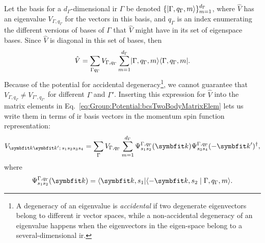 Let the basis for a $d_\Gamma$-dimensional \ac{ir} $\Gamma$ be denoted $\{\lvert \Gamma,q_\Gamma,m \rangle\}_{m=1}^{d_\Gamma}$, where $\hat{V}$ has an eigenvalue $V_{\Gamma,q_\Gamma}$
for the vectors in this basis, and $q_\Gamma$ is an index enumerating the different versions of bases of $\Gamma$ that $\hat{V}$ might have
in its set of eigenspace bases. Since $\hat{V}$ is diagonal in this set of bases, then
\begin{equation}
    \label{eq:Group:Potential:potIrrepDecomp}
    \hat{V} = \sum_{\Gamma q_\Gamma}V_{\Gamma,q_\Gamma}\sum_{m=1}^{d_\Gamma}\lvert \Gamma,q_\Gamma,m \rangle\langle \Gamma,q_\Gamma,m \rvert.
\end{equation}
Because of the potential for accidental degeneracy\footnote{A degeneracy of an eigenvalue is \emph{accidental} if two degenerate eigenvectors belong to different \ac{ir} vector spaces,
while a non-accidental degeneracy of an eigenvalue happens when the eigenvectors in the eigen-space belong to a several-dimensional \ac{ir}.},
we cannot guarantee that $V_{\Gamma,q_\Gamma}\neq V_{\Gamma',q_{\Gamma'}}$ for different $\Gamma$ and $\Gamma'$.
Inserting this expression for $\hat{V}$ into the matrix elements in Eq.~\eqref{eq:Group:Potential:bcsTwoBodyMatrixElem} lets us write them in terms of
\ac{ir} basis vectors in the momentum spin function representation:
\begin{equation}
    \label{eq:Group:Potential:irrepPotMatrixElem}
    V_{\v{k}\v{k}';\,s_1s_2s_3s_4} = \sum_\Gamma V_{\Gamma,q_\Gamma}\sum_{m=1}^{d_\Gamma}\Psi_{s_1s_2}^{\Gamma,q_\Gamma}(\v{k})\Psi_{s_3s_4}^{\Gamma,q_\Gamma}(-\v{k}')^\dagger,
\end{equation}
where
\begin{equation}
    \label{eq:Group:Potential:irrepPotMatrixElem:coeff}
    \Psi_{s_1s_2}^{\Gamma,q_\Gamma}(\v{k}) = \bra{\v{k},s_1}\braket{-\v{k},s_2}{\Gamma,q_\Gamma,m}.
\end{equation}

